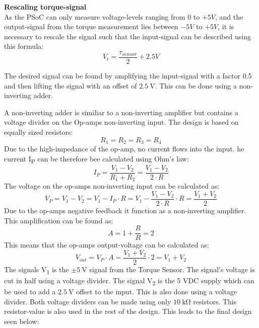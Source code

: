 \textbf{Rescaling torque-signal}\\
As the PSoC can only measure voltage-levels ranging from $0$ to $+5 V$, and the output-signal from the torque measurement lies between $-5 V$ to $+5 V$, it is necessary to rescale the signal such that the input-signal can be described using this formula:
\begin{equation}
	V_t = \frac{\tau_{sensor} }{2} + 2.5 V
\end{equation}

The desired signal can be found by amplifying the input-signal with a factor 0.5 and then lifting the signal with an offset of $\SI{2.5}{\volt}$. This can be done using a non-inverting adder.


A non-inverting adder is similiar to a non-inverting amplifier but contains a voltage divider on the Op-amps non-inverting input. The design is based on equally sized resistors:
\begin{equation}
	R_1 = R_2 = R_3 = R_4
\end{equation}
Due to the high-impedance of the op-amp, no current flows into the input. he current I\textsubscript{P} can be therefore bee calculated using Ohm's law:
\begin{equation}
	I_P = \frac{V_1 - V_2}{R_1 + R_2} = \frac{V_1 - V_2}{2 \cdot R}
\end{equation}
The voltage on the op-amps non-inverting input can be calculated as:
\begin{equation}
	V_P = V_1 - V_2 = V_1 - I_P \cdot R = V_1 - \frac{V_1 - V_2}{2 \cdot R} \cdot R = \frac{V_1 + V_2}{2}
\end{equation}
Due to the op-amps negative feedback it function as a non-inverting amplifier. This amplification can be found as:
\begin{equation}
	A = 1 + \frac{R}{R} = 2
\end{equation}
This means that the op-amps output-voltage can be calculated as:
\begin{equation}
	V_{out} = V_P \cdot A = \frac{V_1 + V_2}{2} \cdot 2 = V_1 + V_2
\end{equation}
The signals V\textsubscript{1} is the $\pm \SI{5}{\volt}$ signal from the Torque Sensor. The signal's voltage is cut in half using a voltage divider. The signal V\textsubscript{2} is the 5 VDC supply which can be used to add a $\SI{2.5}{\volt}$ offset to the input. This is also done using a voltage divider. Both voltage dividers can be made using only $\SI{10}{\kilo \ohm}$ resistors. This resistor-value is also used in the rest of the design. This leads to the final design seen below:


